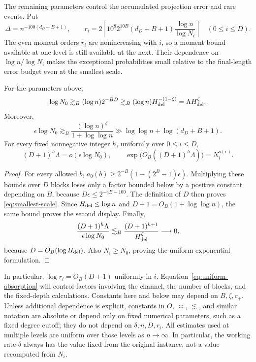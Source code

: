The remaining parameters control the accumulated projection error and rare events.  Put
\[
 \Delta=n^{-100(d_D+B+1)},\qquad
 r_i=2\left\lceil 10^8 2^{10B}(d_D+B+1)
       \frac{\log n}{\log N_i}\right\rceil\quad(0\le i\le D).
\]
The even moment orders $r_i$ are nonincreasing with $i$, so a moment bound available at one level is still available at the next.  Their dependence on $\log n/\log N_i$ makes the exceptional probabilities small relative to the final-length error budget even at the smallest scale.

\begin{lemma}\label{lem:scale-margins}
For the parameters above,
\begin{equation}\label{eq:smallest-scale}
 \log N_0\gtrsim_B (\log n)2^{-BD}
 \gtrsim_B (\log n)H_{\rm del}^{-(1-\zeta)}
 =\Lambda H_{\rm del}^{\zeta}.
\end{equation}
Moreover,
\[
 \epsilon\log N_0\gtrsim_B
 \frac{(\log n)^\zeta}{1+\log\log n}
 \gg\log\log n+\log(d_D+B+1).
\]
For every fixed nonnegative integer $h$, uniformly over $0\le i\le D$,
\begin{equation}\label{eq:uniform-absorption}
 (D+1)^h\Lambda=o(\epsilon\log N_0),\qquad
 \exp\bigl(O_B((D+1)^h\Lambda)\bigr)=N_i^{o(\epsilon)}.
\end{equation}
\end{lemma}

\begin{proof}
For every allowed $b$,
$a_0(b)\ge2^{-B}(1-(2^B-1)\epsilon)$.  Multiplying these bounds over $D$ blocks loses only a factor bounded below by a positive constant depending on $B$, because $D\epsilon\le2^{-4B-100}$.  The definition of $D$ then proves \eqref{eq:smallest-scale}.  Since $H_{\rm del}\le\log n$ and $D+1=O_B(1+\log\log n)$, the same bound proves the second display.  Finally,
\[
 \frac{(D+1)^h\Lambda}{\epsilon\log N_0}
 \lesssim_B\frac{(D+1)^{h+1}}{H_{\rm del}^{\zeta}}
 \longrightarrow0,
\]
because $D=O_B(\log H_{\rm del})$.  Also $N_i\ge N_0$, proving the uniform exponential formulation.
\end{proof}

In particular, $\log r_i=O_B(D+1)$ uniformly in $i$.  Equation~\eqref{eq:uniform-absorption} will control factors involving the channel, the number of blocks, and the fixed-depth calculations.  Constants here and below may depend on $B,\zeta,c_+$.  Unless additional dependence is explicit, constants in $O$, $\asymp$, $\lesssim$, and similar notation are absolute or depend only on fixed numerical parameters, such as a fixed degree cutoff; they do not depend on $\delta,n,D,r_i$.  All estimates used at multiple levels are uniform over those levels as $n\to\infty$.  In particular, the working rate $\delta$ always has the value fixed from the original instance, not a value recomputed from $N_i$.

